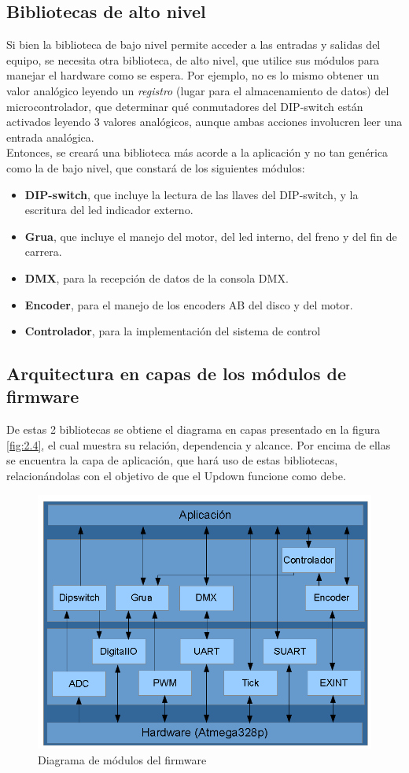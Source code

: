 \subsection{Bibliotecas de alto nivel}
Si bien la biblioteca de bajo nivel permite acceder a las entradas y salidas del equipo, se necesita otra biblioteca, de alto nivel, que utilice sus módulos para manejar el hardware como se espera. Por ejemplo, no es lo mismo obtener un valor analógico leyendo un \textit{registro} (lugar para el almacenamiento de datos) del microcontrolador, que determinar qué conmutadores del DIP-switch están activados leyendo 3 valores analógicos, aunque ambas acciones involucren leer una entrada analógica.\\
Entonces, se creará una biblioteca más acorde a la aplicación y no tan genérica como la de bajo nivel, que constará de los siguientes módulos:
\begin{itemize}
	\item \textbf{DIP-switch}, que incluye la lectura de las llaves del DIP-switch, y la escritura del led indicador externo.
	\item \textbf{Grua}, que incluye el manejo del motor, del led interno, del freno y del fin de carrera.
	\item \textbf{DMX}, para la recepción de datos de la consola DMX.
	\item \textbf{Encoder}, para el manejo de los encoders AB del disco y del motor.
	\item \textbf{Controlador}, para la implementación del sistema de control
\end{itemize}

\subsection{Arquitectura en capas de los módulos de firmware}
De estas 2 bibliotecas se obtiene el diagrama en capas presentado en la figura \ref{fig:2.4}, el cual muestra su relación, dependencia y alcance. Por encima de ellas se encuentra la capa de aplicación, que hará uso de estas bibliotecas, relacionándolas con el objetivo de que el Updown funcione como debe.

\begin{figure}[!ht]
	\centering
	\includegraphics[width=14cm,scale=1]{resources/2_4-diagramaDeModulos.png}
	\caption{Diagrama de módulos del firmware}
	\label{fig:\thefigure}
\end{figure}
